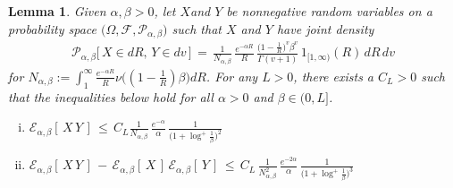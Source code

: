 \documentclass[10pt]{article}
\numberwithin{equation}{section}
\newtheorem{lemma}[theorem]{Lemma}
\theoremstyle{definition}
\begin{document}
\begin{lemma} \label{lem exp} Given $\alpha,\beta>0$, let $X$and $Y$ be nonnegative random variables on a probability space $\big(\Omega,\mathcal{F},\mathcal{P}_{\alpha,\beta} \big)$ such that $X$ and $Y$ have joint density
\begin{align*}
\mathcal{P}_{\alpha,\beta}\big[\, X\in dR,\, Y\in dv   \,\big] \,=\,   \frac{1}{N_{\alpha,\beta} }\,\frac{ e^{-\alpha R } }{ R }\, \frac{ \big(1-\frac{1}{R}\big)^v \beta^v  }{\Gamma(v+1)  }\,1_{[1,\infty)}(R) \,dR\,dv
\end{align*}
for
$N_{\alpha,\beta}:=\int_1^{\infty}\frac{ e^{-\alpha R } }{ R } \nu\big( (1-\frac{1}{R}) \beta  \big)dR$. For any $L>0$, there exists a $C_L>0$ such that the inequalities below hold for all $\alpha>0$ and $\beta\in (0, L]$.
\begin{enumerate}[(i)]
\item $  \displaystyle   \mathcal{E}_{\alpha, \beta}[\,X\,Y\,] \, \leq \,C_L\frac{1}{ N_{\alpha,\beta}}\,\frac{ e^{-\alpha  } }{ \alpha} \, \frac{1}{\big(1+\log^+\frac{1}{\beta}\big)^2 } $

\item  $    \displaystyle \mathcal{E}_{\alpha,\beta}[\,X\,Y\,]\,-\,  \mathcal{E}_{\alpha,\beta}[\,X\,]\,\mathcal{E}_{\alpha,\beta}[\,Y\,]  \, \leq \, C_L\,\frac{ 1}{N_{\alpha,\beta}^2}\,\frac{e^{-2\alpha}}{\alpha }\,\frac{1}{ \big(1+\log^+ \frac{1}{\beta}\big)^3}$

\end{enumerate}

 \end{lemma} 

 
\end{document}
